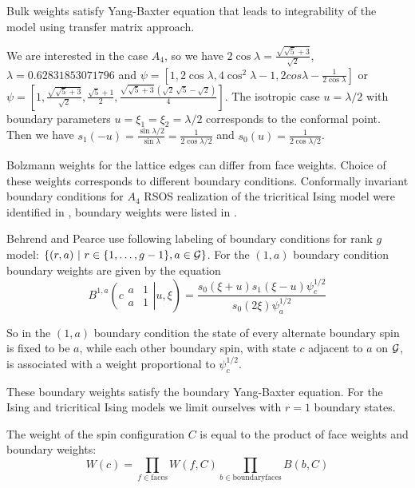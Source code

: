 \documentclass[12pt]{article}
\begin{document}
Bulk weights satisfy Yang-Baxter equation \cite{behrend2001integrable}
that leads to integrability of the model using transfer matrix
approach. 

  We are interested in the case $A_4$, so we have
$2\cos\lambda=\frac{\sqrt{\sqrt{5}+3}}{\sqrt{2}}$,
$\lambda=0.62831853071796$ and $\psi=\left[1,2\cos\lambda,
  4\cos^2\lambda-1, 2cos\lambda-\frac{1}{2\cos\lambda}\right]$ or $\psi=\left[1,\frac{\sqrt{\sqrt{5}+3}}{\sqrt{2}},\frac{\sqrt{5}+1}{2},\frac{\sqrt{\sqrt{5}+3}\,\left( \sqrt{2}\,\sqrt{5}-\sqrt{2}\right) }{4}\right]$.
The isotropic case $u=\lambda/2$ with boundary parameters
$u=\xi_1=\xi_2=\lambda/2$ corresponds to the  conformal point. Then we have
$s_1(-u)=\frac{\sin\lambda/2}{\sin\lambda}=\frac{1}{2\cos\lambda/2}$ and $s_0(u)=\frac{1}{2\cos\lambda/2}$.

Bolzmann weights for the lattice edges can differ from face weights.
Choice of these weights corresponds to different boundary conditions.
Conformally invariant boundary conditions for $A_4$ RSOS realization
of the tricritical Ising model were identified in
\cite{chim1996boundary}, boundary weights were listed in
\cite{behrend2001integrable}. 

Behrend and Pearce use following labeling of boundary conditions for
rank $g$ model:
$\left\{(r,a)\ |\ r\in\{1,\dots,g-1\}, a\in {\cal G}\right\}$. For the
$(1,a)$ boundary condition boundary weights are given by the equation
\begin{equation}
  \label{eq:8}
  B^{1,a}\left.\left( c
    \begin{array}{ll}
      a & 1\\
      a & 1
    \end{array}\right| u, \xi \right)= \frac{s_0(\xi+u) s_1(\xi-u)
  \psi^{1/2}_c } {s_0(2\xi) \psi_a^{1/2}}
\end{equation}

So in the $(1, a)$ boundary condition the state of every alternate
boundary spin is fixed to be $a$, while each other boundary spin,
with state $c$ adjacent to $a$ on ${\cal G}$, is associated with a
weight proportional to $\psi_c^{1/2}$. 

These boundary weights satisfy the boundary Yang-Baxter equation.
For the Ising and tricritical Ising models we limit ourselves with $r=1$
boundary states. 

The weight of the spin configuration $C$ is equal to the product of
face weights and boundary weights:
\begin{equation}
  \label{eq:7}
  W(c)=\prod_{f\in \mathrm{faces}} W(f,C) \prod_{b\in \mathrm{boundary
      faces}} B(b,C)
\end{equation}
\end{document}
